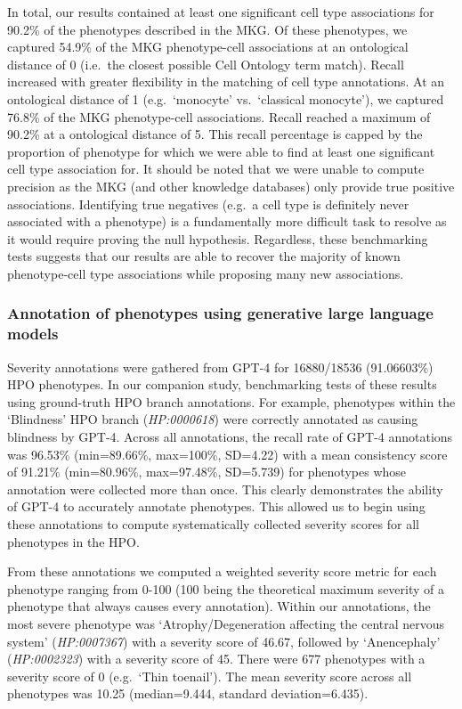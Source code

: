 \documentclass[
]{agujournal2019}
\begin{document}
In total, our results contained at least one significant cell type
associations for 90.2\% of the phenotypes described in the MKG. Of these
phenotypes, we captured 54.9\% of the MKG phenotype-cell associations at
an ontological distance of 0 (i.e.~the closest possible Cell Ontology
term match). Recall increased with greater flexibility in the matching
of cell type annotations. At an ontological distance of 1
(e.g.~`monocyte' vs.~`classical monocyte'), we captured 76.8\% of the
MKG phenotype-cell associations. Recall reached a maximum of 90.2\% at a
ontological distance of 5. This recall percentage is capped by the
proportion of phenotype for which we were able to find at least one
significant cell type association for. It should be noted that we were
unable to compute precision as the MKG (and other knowledge databases)
only provide true positive associations. Identifying true negatives
(e.g.~a cell type is definitely never associated with a phenotype) is a
fundamentally more difficult task to resolve as it would require proving
the null hypothesis. Regardless, these benchmarking tests suggests that
our results are able to recover the majority of known phenotype-cell
type associations while proposing many new associations.

\subsubsection{Annotation of phenotypes using generative large language
models}\label{annotation-of-phenotypes-using-generative-large-language-models}

Severity annotations were gathered from GPT-4 for 16880/18536
(91.06603\%) HPO phenotypes. In our companion study, benchmarking tests
of these results using ground-truth HPO branch annotations. For example,
phenotypes within the `Blindness' HPO branch (\emph{HP:0000618}) were
correctly annotated as causing blindness by GPT-4. Across all
annotations, the recall rate of GPT-4 annotations was 96.53\%
(min=89.66\%, max=100\%, SD=4.22) with a mean consistency score of
91.21\% (min=80.96\%, max=97.48\%, SD=5.739) for phenotypes whose
annotation were collected more than once. This clearly demonstrates the
ability of GPT-4 to accurately annotate phenotypes. This allowed us to
begin using these annotations to compute systematically collected
severity scores for all phenotypes in the HPO.

From these annotations we computed a weighted severity score metric for
each phenotype ranging from 0-100 (100 being the theoretical maximum
severity of a phenotype that always causes every annotation). Within our
annotations, the most severe phenotype was `Atrophy/Degeneration
affecting the central nervous system' (\emph{HP:0007367}) with a
severity score of 46.67, followed by `Anencephaly' (\emph{HP:0002323})
with a severity score of 45. There were 677 phenotypes with a severity
score of 0 (e.g.~`Thin toenail'). The mean severity score across all
phenotypes was 10.25 (median=9.444, standard deviation=6.435).
\end{document}
